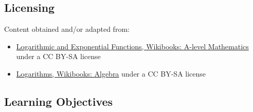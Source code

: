 \subsection{Licensing}
\label{sss:lice-7352}




Content obtained and/or adapted from:



\begin{itemize}
    \item \href{https://en.wikibooks.org/wiki/A-level_Mathematics/CIE/Pure_Mathematics_2/Logarithmic_and_Exponential_Functions}{Logarithmic and Exponential Functions, Wikibooks: A-level Mathematics} under a CC BY-SA license
    \item \href{https://en.wikibooks.org/wiki/Algebra/Logarithms}{Logarithms, Wikibooks: Algebra} under a CC BY-SA license
\end{itemize}


\subsection{Learning Objectives}
\label{ssec:lear-fe6e}



